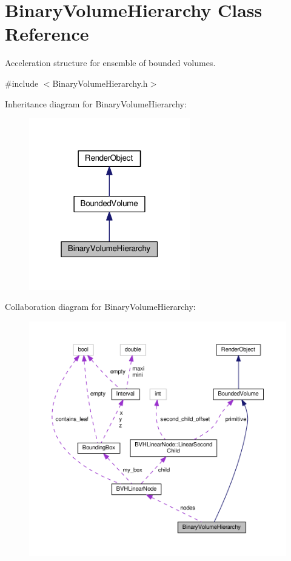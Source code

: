 \hypertarget{classBinaryVolumeHierarchy}{}\section{Binary\+Volume\+Hierarchy Class Reference}
\label{classBinaryVolumeHierarchy}


Acceleration structure for ensemble of bounded volumes.  




{\ttfamily \#include $<$Binary\+Volume\+Hierarchy.\+h$>$}



Inheritance diagram for Binary\+Volume\+Hierarchy\+:\nopagebreak
\begin{figure}[H]
\begin{center}
\leavevmode
\includegraphics[width=199pt]{classBinaryVolumeHierarchy__inherit__graph}
\end{center}
\end{figure}


Collaboration diagram for Binary\+Volume\+Hierarchy\+:\nopagebreak
\begin{figure}[H]
\begin{center}
\leavevmode
\includegraphics[width=350pt]{classBinaryVolumeHierarchy__coll__graph}
\end{center}
\end{figure}
